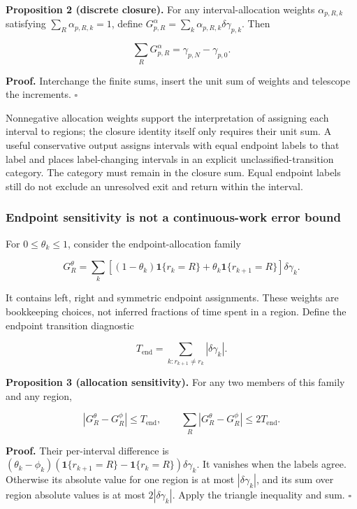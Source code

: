 \textbf{Proposition 2 (discrete closure).} For any interval-allocation
weights \(\alpha_{p,R,k}\) satisfying \(\sum_R\alpha_{p,R,k}=1\), define
\(G_{p,R}^{\alpha}=\sum_k\alpha_{p,R,k}\delta\gamma_{p,k}\). Then

\[
\sum_R G_{p,R}^{\alpha}=\gamma_{p,N}-\gamma_{p,0}.
\]

\textbf{Proof.} Interchange the finite sums, insert the unit sum of
weights and telescope the increments. \(\square\)

Nonnegative allocation weights support the interpretation of assigning
each interval to regions; the closure identity itself only requires
their unit sum. A useful conservative output assigns intervals with
equal endpoint labels to that label and places label-changing intervals
in an explicit unclassified-transition category. The category must
remain in the closure sum. Equal endpoint labels still do not exclude an
unresolved exit and return within the interval.

\subsubsection{Endpoint sensitivity is not a continuous-work error
bound}\label{endpoint-sensitivity-is-not-a-continuous-work-error-bound}

For \(0\leq\theta_k\leq1\), consider the endpoint-allocation family

\[
G_R^{\theta}=\sum_k
\left[(1-\theta_k)\mathbf1\{r_k=R\}
 +\theta_k\mathbf1\{r_{k+1}=R\}\right]\delta\gamma_k.
\]

It contains left, right and symmetric endpoint assignments. These
weights are bookkeeping choices, not inferred fractions of time spent in
a region. Define the endpoint transition diagnostic

\[
T_{\mathrm{end}}=\sum_{k:r_{k+1}\ne r_k}|\delta\gamma_k|.
\]

\textbf{Proposition 3 (allocation sensitivity).} For any two members of
this family and any region,

\[
|G_R^{\theta}-G_R^{\phi}|\leq T_{\mathrm{end}},\qquad
\sum_R|G_R^{\theta}-G_R^{\phi}|\leq2T_{\mathrm{end}}.
\]

\textbf{Proof.} Their per-interval difference is \((\theta_k-\phi_k)
(\mathbf1\{r_{k+1}=R\}-\mathbf1\{r_k=R\})\delta\gamma_k\). It vanishes
when the labels agree. Otherwise its absolute value for one region is at
most \(|\delta\gamma_k|\), and its sum over region absolute values is at
most \(2|\delta\gamma_k|\). Apply the triangle inequality and sum.
\(\square\)

